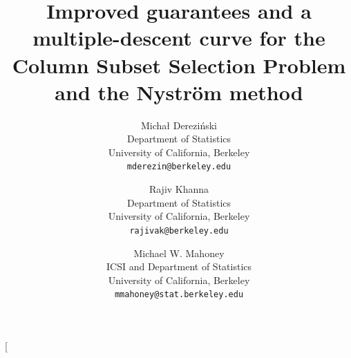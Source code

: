 \documentclass{article}
\begin{document}
\ifisarxiv
\title{Improved guarantees and a multiple-descent curve
  for the\\ Column Subset Selection Problem
  and the Nystr\"om method}
  \author{%
          Micha{\l } Derezi\'{n}ski \\
  Department of Statistics\\
  University of California, Berkeley\\
  \texttt{mderezin@berkeley.edu}\\
  \and
Rajiv Khanna \\
  Department of Statistics\\
  University of California, Berkeley\\
  \texttt{rajivak@berkeley.edu}
  \and
   Michael W. Mahoney\\
  ICSI and Department of Statistics\\
  University of California, Berkeley\\
  \texttt{mmahoney@stat.berkeley.edu}
  }

\else
\twocolumn[




\begin{icmlauthorlist}
\end{icmlauthorlist}
\end{document}
